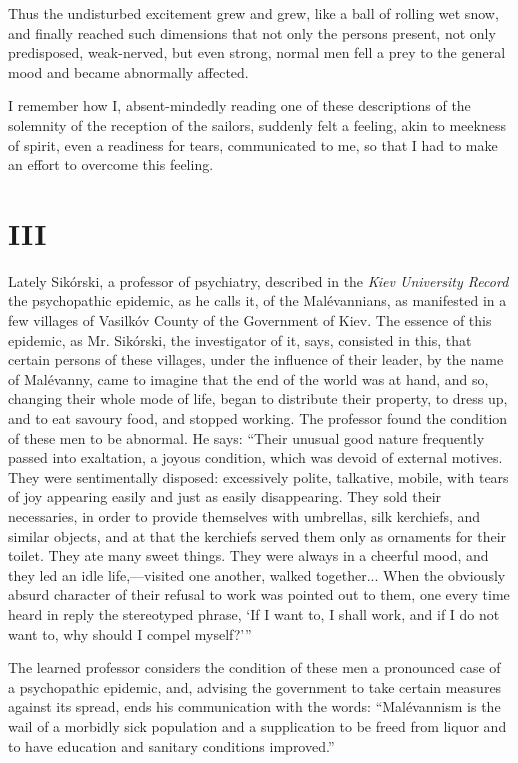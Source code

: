 \documentclass{book}
\begin{document}
Thus the undisturbed excitement grew and grew, like a ball of rolling wet snow, and finally reached such dimensions that not only the persons present, not only predisposed, weak-nerved, but even strong, normal men fell a prey to the general mood and became abnormally affected.

I remember how I, absent-mindedly reading one of these descriptions of the solemnity of the reception of the sailors, suddenly felt a feeling, akin to meekness of spirit, even a readiness for tears, communicated to me, so that I had to make an effort to overcome this feeling.

\chapter{III}
\label{chapter-3}
Lately Sikórski, a professor of psychiatry, described in the \emph{Kiev University Record} the psychopathic epidemic, as he calls it, of the Malévannians, as manifested in a few villages of Vasilkóv County of the Government of Kiev. The essence of this epidemic, as Mr. Sikórski, the investigator of it, says, consisted in this, that certain persons of these villages, under the influence of their leader, by the name of Malévanny, came to imagine that the end of the world was at hand, and so, changing their whole mode of life, began to distribute their property, to dress up, and to eat savoury food, and stopped working. The professor found the condition of these men to be abnormal. He says: “Their unusual good nature frequently passed into exaltation, a joyous condition, which was devoid of external motives. They were sentimentally disposed: excessively polite, talkative, mobile, with tears of joy appearing easily and just as easily disappearing. They sold their necessaries, in order to provide themselves with umbrellas, silk kerchiefs, and similar objects, and at that the kerchiefs served them only as ornaments for their toilet. They ate many sweet things. They were always in a cheerful mood, and they led an idle life,—visited one another, walked together... When the obviously absurd character of their refusal to work was pointed out to them, one every time heard in reply the stereotyped phrase, ‘If I want to, I shall work, and if I do not want to, why should I compel myself?’”

The learned professor considers the condition of these men a pronounced case of a psychopathic epidemic, and, advising the government to take certain measures against its spread, ends his communication with the words: “Malévannism is the wail of a morbidly sick population and a supplication to be freed from liquor and to have education and sanitary conditions improved.”
\end{document}
